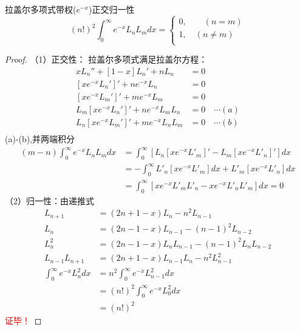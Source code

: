 		\begin{proposition}拉盖尔多项式带权($e^{-x}$)正交归一性 
			\begin{equation*}
				(n!)^2 \int_{0}^{\infty}  e^{-x} L_n L_m dx = \left\{
			\begin{split}
				0, \qquad (n=m)  \\
				1, \quad (n \ne m)  \\
			\end{split}	\right.	
			\end{equation*}	
		\end{proposition}
		\begin{proof}
		（1）正交性： 拉盖尔多项式满足拉盖尔方程：
		\begin{equation*}
			\begin{split}
				x L_n''  + [1 -x] L_n' +n L_n &=0  \\
				[xe^{-x}  L_n'] ' +n e^{-x} L_n &=0  \\
				[xe^{-x}  L_m'] ' +m e^{-x} L_m &=0  \\ 
				L_m[xe^{-x}  L_n'] ' +n e^{-x} L_m L_n &=0  \quad \cdots (a)\\
				L_n  [xe^{-x}  L_m'] ' +m e^{-x} L_n L_m& =0  \quad \cdots (b)\\ 
			\end{split}		
		\end{equation*}	
		(a)-(b),并两端积分
			\begin{equation*}
				\begin{split}
					(m-n) \int_{0}^{\infty}  e^{-x} L_n L_m dx &=  \int_{0}^{\infty} [L_n  [xe^{-x}  L' _m] ' - L_m[xe^{-x}  L' _n] '] dx \\
					&=  -\int_{0}^{\infty} L'_n  [xe^{-x}  L' _m] dx + L'_m[xe^{-x}  L' _n]  dx \\
					&=  \int_{0}^{\infty} [xe^{-x}  L' _m L' _n - xe^{-x}  L' _n L' _m]  dx =0
				\end{split}		
			\end{equation*}	
		（2）归一性：由递推式
			\begin{equation*}
				\begin{split}
					L_{n+1} &= (2n+1-x) L_n  -n^2 L_{n-1}  \\
					L_{n} &= (2n-1-x) L_{n-1}  -(n-1)^2 L_{n-2}  \\
					L^2 _{n} &= (2n-1-x) L_n  L_{n-1}  -(n-1)^2 L_n L_{n-2}  \\
					L_{n-1}	L_{n+1} &= (2n+1-x)	L_{n-1}	 L_n  -n^2 	L^2 _{n-1}  \\
					\int_{0}^{\infty}  e^{-x}  L^2 _{n}  dx &=  n^2   \int_{0}^{\infty}  e^{-x}  L^2 _{n-1} dx  \\
					&=  (n!)^2   \int_{0}^{\infty}  e^{-x}  L^2 _{0} dx  \\
					&=  (n!)^2 
				\end{split}		
			\end{equation*}		
		\textcolor{red}{证毕！}
		\end{proof}
		
